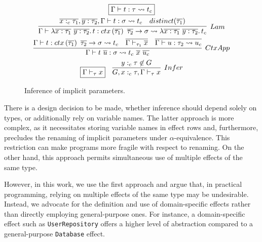 \documentclass[acmsmall,review,screen]{acmart}
\newcommand{\mathframebox}[1]{\framebox{$\displaystyle #1$}}
\newcommand{\ap}{~}
\newcommand{\ctx}[1]{ctx\left(#1\right)~}
\newcommand{\step}{\rightsquigarrow}
\begin{document}
\begin{figure}
    \begin{gather*}
        \mathframebox{\Gamma\vdash t : \tau \step t_{c}} \\
        \infer[Lam]{
            \Gamma\vdash \lambda \overline{x : \tau_1} ~ \overline{y : \tau_2} \ldotp t : \ctx{\overline{\tau_1}} \overline{\tau_2} \to \sigma \step \lambda \overline{x : \tau_1} ~ \overline{y : \tau_2} \ldotp t_c
        }{
            \overline{x :_c \tau_1}, \overline{y : \tau_2}, \Gamma\vdash t : \sigma \step t_c &
            distinct(\overline{\tau_1})
        } \\
        \infer[CtxApp]{
            \Gamma\vdash t\ap\overline{u} : \sigma \step t_{c} \ap \overline{x}\ap\overline{u_{c}}
        }{
            \Gamma\vdash t : \ctx{\overline{\tau_1}} \overline{\tau_2} \to \sigma \step t_{c} &
            \overline{\Gamma\vdash_{\tau_1}\overline{x}} &
            \overline{\Gamma\vdash u : \tau_2 \step u_{c}}
        } \\
        \begin{array}{cc}
            \mathframebox{\Gamma\vdash_\tau x} &
            \infer[Infer]{
                G, x :_c \tau, \Gamma\vdash_{\tau} x
            }{
                y :_c \tau \not\in G
            }
        \end{array}
    \end{gather*}
    \caption{Inference of implicit parameters.}
    \label{fig:core-im-core-implicit-inference}
\end{figure}

There is a design decision to be made, whether inference should depend solely on types, or additionally rely on variable names.
The latter approach is more complex, as it necessitates storing variable names in effect rows and, furthermore, precludes the renaming of implicit parameters under $\alpha$-equivalence.
This restriction can make programs more fragile with respect to renaming.
On the other hand, this approach permits simultaneous use of multiple effects of the same type.

However, in this work, we use the first approach and argue that, in practical programming, relying on multiple effects of the same type may be undesirable.
Instead, we advocate for the definition and use of domain-specific effects rather than directly employing general-purpose ones.
For instance, a domain-specific effect such as \lstinline[language=colang]{UserRepository} offers a higher level of abstraction compared to a general-purpose \lstinline[language=colang]{Database} effect.
\end{document}

